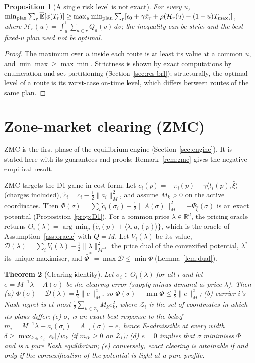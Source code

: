 \documentclass[preprint,12pt]{elsarticle}
\newtheorem{theorem}{Theorem}
\newtheorem{proposition}[theorem]{Proposition}
\theoremstyle{definition}
\theoremstyle{remark}
\newcommand{\R}{\mathbb{R}}
\newcommand{\Eu}{\overline{\mathbb{E}}}
\newcommand{\Qb}{\overline{Q}}
\newcommand{\xb}{\bar x}
\newcommand{\ip}[2]{\langle #1,#2\rangle}
\begin{document}
\begin{proposition}[A single risk level is not exact]\label{prop:fixedu}
For every $u$, $\min_{\rm plan}\sum_r\Eu[\phi(T_r)]\ge\max_u\min_{\rm plan}\sum_r[c_0+\gamma\xb_r+\rho(\mathcal H_r(u)-(1-u)T_{\max})]$, where $\mathcal H_r(u)=\int_u^1\sum_{a\in r}\Qb_a(v)\,dv$; the inequality can be strict and the best fixed-$u$ plan need not be optimal.
\end{proposition}
\begin{proof}
The maximum over $u$ inside each route is at least its value at a common $u$, and $\min\max\ge\max\min$. Strictness is shown by exact computations by enumeration and set partitioning (Section~\ref{sec:res-brl}); structurally, the optimal level of a route is its worst-case on-time level, which differs between routes of the same plan.
\end{proof}

\section{Zone-market clearing (ZMC)}\label{app:zmc}

ZMC is the first phase of the equilibrium engine (Section~\ref{sec:engine}). It is stated here with its guarantees and proofs; Remark~\ref{rem:zmc} gives the negative empirical result.

ZMC targets the D1 game in cost form. Let $c_i(p)=-\pi_i(p)+\gamma\ip{t_i(p)}{\hat\xi}$ (charges included), $\tilde c_i=c_i-\tfrac12\|a_i\|_M^2$, and assume $M_k>0$ on the active coordinates. Then $\Phi(\sigma)=\sum_i\tilde c_i(\sigma_i)+\tfrac12\|A(\sigma)\|_M^2=-\Psi_{\hat\xi}(\sigma)$ is an exact potential (Proposition~\ref{prop:D1}). For a common price $\lambda\in\R^d$, the pricing oracle returns $O_i(\lambda)=\arg\min_p\{\tilde c_i(p)+\ip{\lambda}{a_i(p)}\}$, which is the oracle of Assumption~\ref{ass:oracle} with $Q=M$. Let $V_i(\lambda)$ be its value, $\mathcal D(\lambda)=\sum_iV_i(\lambda)-\tfrac12\|\lambda\|^2_{M^{-1}}$ the price dual of the convexified potential, $\lambda^*$ its unique maximiser, and $\bar\Phi^*=\max\mathcal D\le\min\Phi$ (Lemma~\ref{lem:dual}).

\begin{theorem}[Clearing identity]\label{thm:clear}
Let $\sigma_i\in O_i(\lambda)$ for all $i$ and let $e=M^{-1}\lambda-A(\sigma)$ be the clearing error (supply minus demand at price $\lambda$). Then
(a) $\Phi(\sigma)-\mathcal D(\lambda)=\tfrac12\|e\|_M^2$, so $\Phi(\sigma)-\min\Phi\le\tfrac12\|e\|_M^2$;
(b) carrier $i$'s Nash regret is at most $\tfrac12\sum_{k\in\mathcal Z_i}M_ke_k^2$, where $\mathcal Z_i$ is the set of coordinates in which its plans differ;
(c) $\sigma_i$ is an exact best response to the belief $m_i=M^{-1}\lambda-a_i(\sigma_i)=A_{-i}(\sigma)+e$, hence E-admissible at every width $\delta\ge\max_{k\in\mathcal Z_i}|e_k|/w_k$ (if $m_{ik}\ge0$ on $\mathcal Z_i$);
(d) $e=0$ implies that $\sigma$ minimises $\Phi$ and is a pure Nash equilibrium;
(e) conversely, exact clearing is attainable if and only if the convexification of the potential is tight at a pure profile.
\end{theorem}
\end{document}
